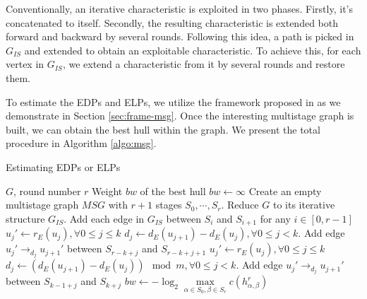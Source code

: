 Conventionally, an iterative characteristic is exploited in two phases. Firstly, it's concatenated to itself. Secondly, the resulting characteristic is extended both forward and backward by several rounds. Following this idea, a path is picked in $G_{IS}$ and extended to obtain an exploitable characteristic. To achieve this, for each vertex in $G_{IS}$, we extend a characteristic from it by several rounds and restore them.

To estimate the EDPs and ELPs, we utilize the framework proposed in \cite{EPRINT:HalVej18} as we demonstrate in Section \ref{sec:frame-msg}. Once the interesting multistage graph is built, we can obtain the best hull within the graph. We present the total procedure in Algorithm \ref{algo:msg}.

\begin{algorithm}
	\caption{Estimating EDPs or ELPs}
	\label{algo:msg}
	\begin{algorithmic}[1]
        \Require $G$, round number $r$
        \Ensure Weight $bw$ of the best hull
        \Procedure {}{}
        \State $bw\leftarrow\infty$
        \State Create an empty multistage graph $MSG$ with $r+1$ stages $S_0,\cdots,S_r$.
        \State Reduce $G$ to its iterative structure $G_{IS}$. 
        \State Add each edge in $G_{IS}$ between $S_i$ and $S_{i+1}$ for any $i\in[0,r-1]$
        \State $u_j'\leftarrow r_E(u_j),\forall 0\leq j\leq k$
        \State $d_j\leftarrow d_E(u_{j+1})-d_E(u_j),\forall 0\leq j<k$.
        \State Add edge $u_j'\rightarrow_{d_j} u_{j+1}'$ between $S_{r-k+j}$ and $S_{r-k+j+1}$
        \EndFor
        \State $u_j'\leftarrow r_E(u_j),\forall 0\leq j\leq k$
        \State $d_j\leftarrow (d_E(u_{j+1})-d_E(u_j))\mod m,\forall 0\leq j<k$.
        \State Add edge $u_j'\rightarrow_{d_j} u_{j+1}'$ between $S_{k-1+j}$ and $S_{k+j}$
        \EndFor
        \State $bw\leftarrow-\log_2\max\limits_{\alpha\in S_0,\beta\in S_r}c(h^r_{\alpha,\beta})$
        \EndProcedure
	\end{algorithmic}
\end{algorithm}
